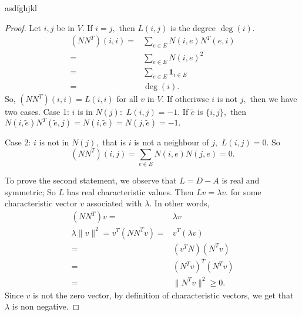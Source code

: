 
\begin{theorem}
	asdfghjkl
\end{theorem}
\begin{proof}
	Let $i,j$ be in $V.$ If $i=j,$ then $L(i,j)$ is the degree
	$\deg(i).$ 
	\begin{align*}
		(N N^T) (i,i)
		={}& \sum_{e \in E} N(i,e) N^T(e,i) \\
		={}& \sum_{e \in E} N(i,e)^2 \\ 
		={}& \sum_{e \in E} \mathbf{1}_{i \in E} \\
		={}& \deg(i).
	\end{align*}
	So, $(NN^T)(i,i) = L(i,i)$ for all $v$ in $V.$
	If otheriwse $i$ is not $j,$ then we have two cases.
	Case 1: $i$ is in $N(j):$ $L(i,j) = -1.$
	If $\tilde{e}$ is $\{i,j\},$ then
	$N(i, \tilde{e}) N^T( \tilde{e}, j) = 
	N(i, \tilde{e}) = N(j, \tilde{e}) = -1.$

	Case 2: $i$ is not in $N(j),$ that is $i$ is not a neighbour
	of $j,$ $L(i,j) = 0.$ So
\begin{equation*}
	(NN^T)(i,j) = \sum_{e \in E} N(i,e) N(j,e)  = 0.
\end{equation*}

To prove the second statement, we observe that $L = D - A$ is real
and symmetric; So $L$ has real characteristic values. Then $L v = 
\lambda v.$ for some characteristic vector $v$ associated with $\lambda.$
In other words, 
\begin{align*}
	(NN^T)v ={}& \lambda v \\
	\lambda \lVert v \rVert^2 = v^T (N N^T v) ={}& v^T (\lambda v)\\
	={}& (v^T N)(N^T v) \\
	={}& (N^T v)^T (N^T v)\\
	={}& \lVert N^T v \rVert^2 \geq 0. 
\end{align*}
Since $v$ is not the zero vector, by definition of characteristic 
vectors, we get that $\lambda$ is non negative.


\end{proof}
